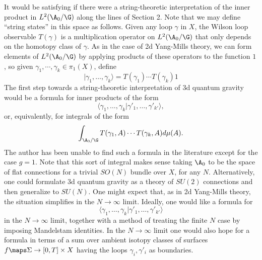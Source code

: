 It would be satisfying if there were a string-theoretic interpretation of
the inner product in $L^2(\A_0/\G)$ along the lines of Section 2.     Note
that we may define ``string states'' in this space as follows.
Given any loop $\gamma$ in $X$, the Wilson loop observable $T(\gamma)$ is a
multiplication operator on $L^2(\A_0/\G)$ that only depends on the homotopy
class of $\gamma$.   As in the case of 2d Yang-Mills theory, we can form
elements of $L^2(\A_0/\G)$ by applying products of these operators to the
function $1$, so given $\gamma_1, \cdots, \gamma_k \in \pi_1(X)$, define
\[     | \gamma_1, \dots, \gamma_k \rangle =  T(\gamma_1) \cdots
T(\gamma_k) 1 \]
The first step towards a string-theoretic interpretation of 3d quantum
gravity would be a formula for inner products of the form
\[    \langle\gamma_1, \dots, \gamma_k| \gamma'_1, \dots,
\gamma'_{k'}\rangle, \]
or, equivalently, for integrals of the form
\[     \int_{\A_0/\G} T(\gamma_1,A) \cdots T(\gamma_k,A) d\mu(A) .\]
The author has been unable to find such a formula in the literature except
for the case $g = 1$.
Note that this sort of integral makes sense taking $\A_0$ to be the space of
flat connections for a trivial $SO(N)$ bundle over $X$, for any $N$.
Alternatively, one could formulate 3d quantum gravity as a theory of $SU(2)$
connections and then generalize to $SU(N)$.
One might expect that, as in 2d Yang-Mills theory, the situation
simplifies in the $N \to \infty$ limit.  Ideally, one would like a formula
for
\[    \langle\gamma_1, \dots, \gamma_k| \gamma'_1, \dots,
\gamma'_{k'}\rangle \]
in the $N \to\infty$ limit, together with a method of treating the
finite $N$ case by imposing Mandelstam identities.   In the $N \to \infty$
limit one would also hope for a formula in
terms of a sum over ambient isotopy classes
of surfaces $f \maps \Sigma \to [0,T] \times X$ having
the loops $\gamma_i, \gamma'_i$ as boundaries.

